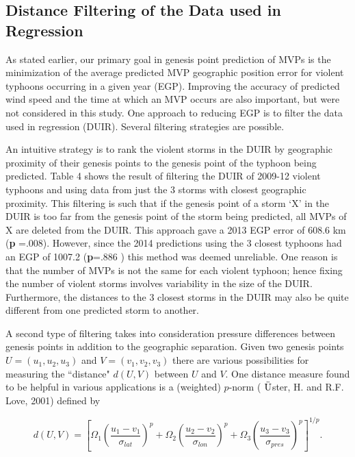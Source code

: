 \documentclass[a4paper, 12pt]{article}
\begin{document}
{  


\subsection{Distance Filtering of the Data used in Regression}
As stated earlier, our primary goal in genesis point prediction of MVPs is the minimization of the average predicted MVP geographic position error for violent typhoons occurring in a given year (EGP). Improving the accuracy of predicted wind speed and the time at which an MVP occurs are also important, but were not considered in this study.  One approach to reducing EGP is to filter the data used in regression (DUIR).  Several filtering strategies are possible.

     An intuitive strategy is to rank the violent storms in the DUIR by geographic proximity of their genesis points to the genesis point of the typhoon being predicted. Table 4 shows the result of filtering the DUIR of 2009-12 violent typhoons and using data from just the 3 storms with closest geographic proximity. This filtering is such that if the genesis point of a storm `X' in the DUIR is too far from the genesis point of the storm being predicted, all MVPs of X are deleted from the DUIR. This approach gave a 2013 EGP error of 608.6 km ({\bf p} =.008).  However, since the 2014 predictions using the 3 closest typhoons had an EGP of 1007.2 ({\bf p}=.886 ) this method was deemed unreliable.  One reason is that the number of MVPs is not the same for each violent typhoon; hence fixing the number of violent storms involves variability in the size of the DUIR. Furthermore, the distances to the 3 closest storms in the DUIR may also be quite different from one predicted storm to another.


A second type of filtering takes into consideration pressure differences between genesis points in addition to the geographic separation. Given two genesis points $U=(u_1,u_2,u_3)$ and $V=(v_1,v_2,v_3)$ there are various possibilities for measuring the ``distance" $d(U,V)$ between $U$ and $V$.  One distance measure  found to be helpful in various applications  is a (weighted) $p$-norm ( $\ddot{\textup{U}}$ster, H. and R.F. Love, 2001) defined by

\begin{displaymath}
d(U,V)=[\Omega_1( \frac{u_1-v_1}{\sigma_{lat}})^p+\Omega_2(\frac{u_2-v_2}{\sigma_{lon}})^p+\Omega_3(\frac{u_3-v_3}{\sigma_{pres}})^p]^{1/p}.
\end{displaymath}


}
\end{document}
